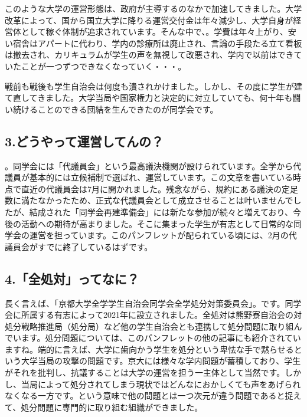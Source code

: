 このような大学の運営形態は、政府が主導するのなかで加速してきました。大学改革によって、国から国立大学に降りる運営交付金は年々減少し、大学自身が経営体として稼ぐ体制が追求されています。そんな中で、。学費は年々上がり、安い宿舎はアパートに代わり、学内の診療所は廃止され、言論の手段たる立て看板は撤去され、カリキュラムが学生の声を無視して改悪され、学内で以前はできていたことが一つずつできなくなっていく・・・。

戦前も戦後も学生自治会は何度も潰されかけました。しかし、その度に学生が建て直してきました。大学当局や国家権力と決定的に対立していても、何十年も闘い続けることのできる団結を生んできたのが同学会です。

\subsection{3.どうやって運営してんの？}

。同学会には「代議員会」という最高議決機関が設けられています。全学から代議員が基本的には立候補制で選ばれ、運営しています。この文章を書いている時点で直近の代議員会は7月に開かれました。残念ながら、規約にある議決の定足数に満たなかったため、正式な代議員会として成立させることは叶いませんでしたが、結成された「同学会再建準備会」には新たな参加が続々と増えており、今後の活動への期待が高まりました。そこに集まった学生が有志として日常的な同学会の運営を担っています。このパンフレットが配られている頃には、2月の代議員会がすでに終了しているはずです。

\subsection{4.「全処対」ってなに？}
長く言えば、「京都大学全学学生自治会同学会全学処分対策委員会」。です。同学会に所属する有志によって2021年に設立されました。全処対は熊野寮自治会の対処分戦略推進局（処分局）など他の学生自治会とも連携して処分問題に取り組んでいます。処分問題については、このパンフレットの他の記事にも紹介されていますね。端的に言えば、大学に歯向かう学生を処分という卑怯な手で黙らせるという大学当局の攻撃の問題です。京大には様々な学内問題が蓄積しており、学生がそれを批判し、抗議することは大学の運営を担う一主体として当然です。しかし、当局によって処分されてしまう現状ではどんなにおかしくても声をあげられなくなる一方です。という意味で他の問題とは一つ次元が違う問題であると捉えて、処分問題に専門的に取り組む組織ができました。

